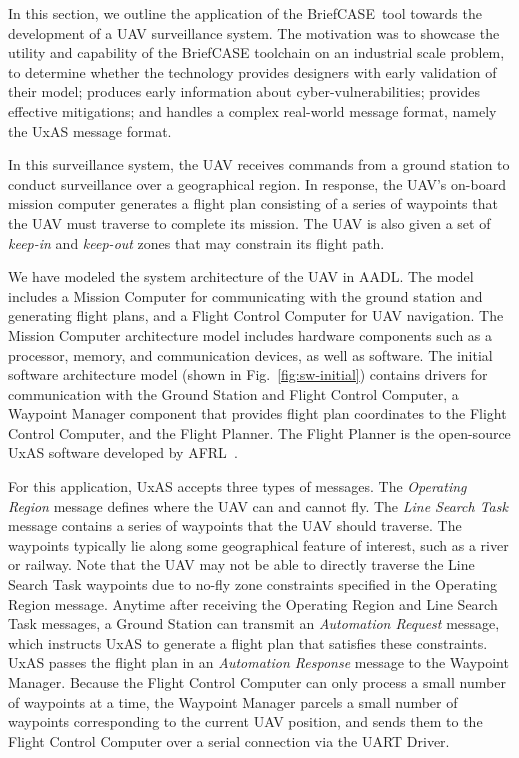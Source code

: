 \documentclass[global,twocolumn]{svjour}
\newcommand{\figref}[1]{Fig.~\ref{#1}}
\newcommand{\brfcs}{BriefCASE}
\begin{document}
In this section, we outline the application of the \brfcs\ tool towards the development of a UAV surveillance system.
%
The motivation was to showcase the utility and capability of the BriefCASE toolchain on an industrial scale problem, to determine whether the technology provides designers with early validation of their model;
%
produces early information about cyber-vulnerabilities;
%
provides effective mitigations;
%
and handles a complex real-world message format, namely the UxAS message format.

In this surveillance system, the UAV receives commands from a ground station to conduct surveillance over a geographical region.
%
In response, the UAV's on-board mission computer generates a flight plan consisting of a series of waypoints that the UAV must traverse to complete its mission.
%
The UAV is also given a set of \textit{keep-in} and \textit{keep-out} zones that may constrain its flight path.

We have modeled the system architecture of the UAV in AADL.
%
The model includes a Mission Computer for communicating with the ground station and generating flight plans, and a Flight Control Computer for UAV navigation.
%
The Mission Computer architecture model includes hardware components such as a processor, memory, and communication devices, as well as software.
%
The initial software architecture model (shown in \figref{fig:sw-initial}) contains drivers for communication with the Ground Station and Flight Control Computer, a Waypoint Manager component that provides flight plan coordinates to the Flight Control Computer, and the Flight Planner.
%
The Flight Planner is the open-source UxAS software developed by AFRL~\cite{uxas}.

For this application, UxAS accepts three types of messages.
%
The \textit{Operating Region} message defines where the UAV can and cannot fly.
%
The \textit{Line Search Task} message contains a series of waypoints that the UAV should traverse.
%
The waypoints typically lie along some geographical feature of interest, such as a river or railway.
%
Note that the UAV may not be able to directly traverse the Line Search Task waypoints due to no-fly zone constraints specified in the Operating Region message.
%
Anytime after receiving the Operating Region and Line Search Task messages, a Ground Station can transmit an \textit{Automation Request} message, which instructs UxAS to generate a flight plan that satisfies these constraints.
%
UxAS passes the flight plan in an \textit{Automation Response} message to the Waypoint Manager.
%
Because the Flight Control Computer can only process a small number of waypoints at a time, the Waypoint Manager parcels a small number of waypoints corresponding to the current UAV position, and sends them to the Flight Control Computer over a serial connection via the UART Driver.
\end{document}
